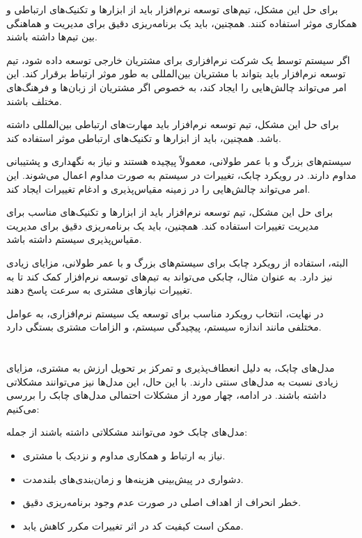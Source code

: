 برای حل این مشکل، تیم‌های توسعه نرم‌افزار باید از ابزارها و تکنیک‌های ارتباطی و همکاری موثر استفاده کنند. همچنین، باید یک برنامه‌ریزی دقیق برای مدیریت و هماهنگی بین تیم‌ها داشته باشند.

اگر سیستم توسط یک شرکت نرم‌افزاری برای مشتریان خارجی توسعه داده شود، تیم توسعه نرم‌افزار باید بتواند با مشتریان بین‌المللی به طور موثر ارتباط برقرار کند. این امر می‌تواند چالش‌هایی را ایجاد کند، به خصوص اگر مشتریان از زبان‌ها و فرهنگ‌های مختلف باشند.

برای حل این مشکل، تیم توسعه نرم‌افزار باید مهارت‌های ارتباطی بین‌المللی داشته باشد. همچنین، باید از ابزارها و تکنیک‌های ارتباطی موثر استفاده کند.

سیستم‌های بزرگ و با عمر طولانی، معمولاً پیچیده هستند و نیاز به نگهداری و پشتیبانی مداوم دارند. در رویکرد چابک، تغییرات در سیستم به صورت مداوم اعمال می‌شوند. این امر می‌تواند چالش‌هایی را در زمینه مقیاس‌پذیری و ادغام تغییرات ایجاد کند.

برای حل این مشکل، تیم توسعه نرم‌افزار باید از ابزارها و تکنیک‌های مناسب برای مدیریت تغییرات استفاده کند. همچنین، باید یک برنامه‌ریزی دقیق برای مدیریت مقیاس‌پذیری سیستم داشته باشد.

البته، استفاده از رویکرد چابک برای سیستم‌های بزرگ و با عمر طولانی، مزایای زیادی نیز دارد. به عنوان مثال، چابکی می‌تواند به تیم‌های توسعه نرم‌افزار کمک کند تا به تغییرات نیازهای مشتری به سرعت پاسخ دهند.

در نهایت، انتخاب رویکرد مناسب برای توسعه یک سیستم نرم‌افزاری، به عوامل مختلفی مانند اندازه سیستم، پیچیدگی سیستم، و الزامات مشتری بستگی دارد.

\section*{}

مدل‌های چابک، به دلیل انعطاف‌پذیری و تمرکز بر تحویل ارزش به مشتری، مزایای زیادی نسبت به مدل‌های سنتی دارند. با این حال، این مدل‌ها نیز می‌توانند مشکلاتی داشته باشند. در ادامه، چهار مورد از مشکلات احتمالی مدل‌های چابک را بررسی می‌کنیم:

مدل‌های چابک خود می‌توانند مشکلاتی داشته باشند از جمله:
\begin{itemize}
	\item نیاز به ارتباط و همکاری مداوم و نزدیک با مشتری.
	\item دشواری در پیش‌بینی هزینه‌ها و زمان‌بندی‌های بلندمدت.
	\item خطر انحراف از اهداف اصلی در صورت عدم وجود برنامه‌ریزی دقیق.
	\item ممکن است کیفیت کد در اثر تغییرات مکرر کاهش یابد.
\end{itemize}